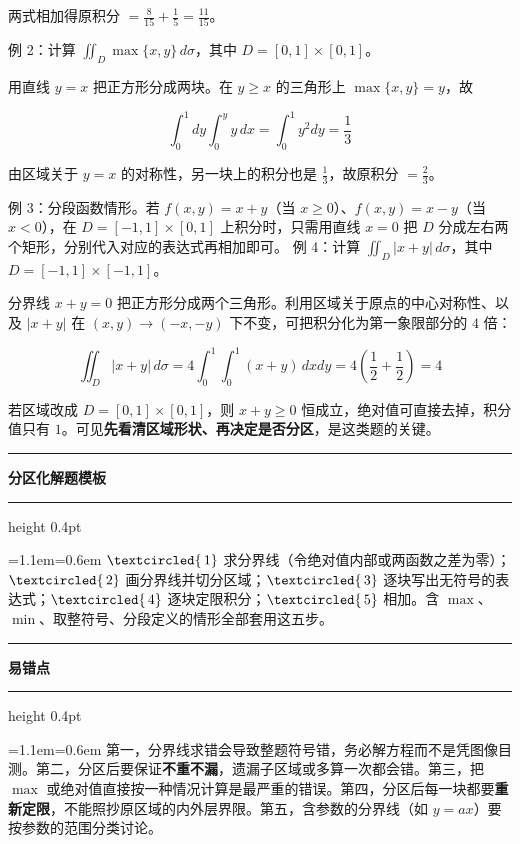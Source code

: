 \documentclass[11pt,openany,UTF8]{ctexbook}
\newcommand{\circled}[1]{\textcircled{\scriptsize\,#1}}
\newcommand{\callouthead}[2]{%
  \par\addvspace{7pt}\noindent
  {\color{#1}\rule[-0.15em]{3pt}{1.05em}}\hspace{0.5em}%
  {\bfseries\color{#1}#2}\par\nobreak\vspace{-0.35em}%
  {\color{rulesep}\hrule height 0.4pt}\nobreak\vspace{0.45em}%
  \begingroup\small\setlength{\parindent}{0pt}%
  \leftskip=1.1em\rightskip=0.6em\noindent\ignorespaces}
\newcommand{\calloutend}{\par\endgroup\addvspace{7pt}}
\newenvironment{callkey}[1]{\callouthead{keybar}{#1}}{\calloutend}
\newenvironment{callwarn}[1]{\callouthead{warnbar}{#1}}{\calloutend}
\begin{document}
两式相加得原积分 $=\frac{8}{15}+\frac15=\frac{11}{15}$。

例 2：计算 $\displaystyle\iint_{D}\max\{x,y\}\,d\sigma$，其中 $D=[0,1]\times[0,1]$。

用直线 $y=x$ 把正方形分成两块。在 $y\ge x$ 的三角形上 $\max\{x,y\}=y$，故

\[\int_{0}^{1}dy\int_{0}^{y}y\,dx=\int_{0}^{1}y^{2}dy=\frac13\]

由区域关于 $y=x$ 的对称性，另一块上的积分也是 $\frac13$，故原积分 $=\frac23$。

例 3：分段函数情形。若 $f(x,y)=x+y$（当 $x\ge 0$）、$f(x,y)=x-y$（当 $x<0$），在 $D=[-1,1]\times[0,1]$ 上积分时，只需用直线 $x=0$ 把 $D$ 分成左右两个矩形，分别代入对应的表达式再相加即可。 例 4：计算 $\displaystyle\iint_{D}\vert x+y\vert\,d\sigma$，其中 $D=[-1,1]\times[-1,1]$。

分界线 $x+y=0$ 把正方形分成两个三角形。利用区域关于原点的中心对称性、以及 $\vert x+y\vert$ 在 $(x,y)\to(-x,-y)$ 下不变，可把积分化为第一象限部分的 $4$ 倍：

\[\iint_{D}\vert x+y\vert\,d\sigma=4\int_{0}^{1}\int_{0}^{1}(x+y)\,dxdy=4\left(\frac12+\frac12\right)=4\]

若区域改成 $D=[0,1]\times[0,1]$，则 $x+y\ge 0$ 恒成立，绝对值可直接去掉，积分值只有 $1$。可见\textbf{先看清区域形状、再决定是否分区}，是这类题的关键。

\begin{callkey}{分区化解题模板}
$\circled{1}$ 求分界线（令绝对值内部或两函数之差为零）；$\circled{2}$ 画分界线并切分区域；$\circled{3}$ 逐块写出无符号的表达式；$\circled{4}$ 逐块定限积分；$\circled{5}$ 相加。含 $\max$、$\min$、取整符号、分段定义的情形全部套用这五步。

\end{callkey}

\begin{callwarn}{易错点}
第一，分界线求错会导致整题符号错，务必解方程而不是凭图像目测。第二，分区后要保证\textbf{不重不漏}，遗漏子区域或多算一次都会错。第三，把 $\max$ 或绝对值直接按一种情况计算是最严重的错误。第四，分区后每一块都要\textbf{重新定限}，不能照抄原区域的内外层界限。第五，含参数的分界线（如 $y=ax$）要按参数的范围分类讨论。

\end{callwarn}
\end{document}

